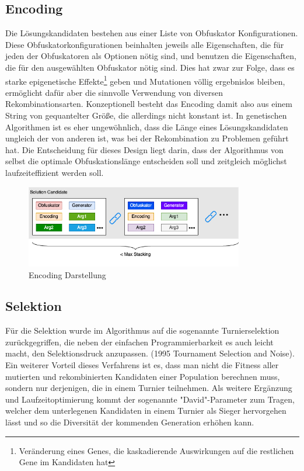 \subsection{Encoding}
Die Lösungskandidaten bestehen aus einer Liste von Obfuskator Konfigurationen. Diese Obfuskatorkonfigurationen beinhalten jeweils alle Eigenschaften, die für jeden der Obfuskatoren als Optionen nötig sind, und benutzen die Eigenschaften, die für den ausgewählten Obfuskator nötig sind. Dies hat zwar zur Folge, dass es starke epigenetische Effekte\footnote{Veränderung eines Genes, die kaskadierende Auswirkungen auf die restlichen Gene im Kandidaten hat} geben und Mutationen völlig ergebnislos bleiben, ermöglicht dafür aber die sinnvolle Verwendung von diversen Rekombinationsarten. Konzeptionell besteht das Encoding damit also aus einem String von gequantelter Größe, die allerdings nicht konstant ist. 
In genetischen Algorithmen ist es eher ungewöhnlich, dass die Länge eines Lösungskandidaten ungleich der von anderen ist, was bei der Rekombination zu Problemen geführt hat. Die Entscheidung für dieses Design liegt darin, dass der Algorithmus von selbst die optimale Obfuskationslänge entscheiden soll und zeitgleich möglichst laufzeiteffizient werden soll.
\begin{figure}[h]
    \centering
    \includegraphics[width=0.85\textwidth]{gfx/Abbildungen/Encoding Diagram.png}
    \caption{Encoding Darstellung}
    \label{fig:encoding}
\end{figure}

\subsection{Selektion}
Für die Selektion wurde im Algorithmus auf die sogenannte Turnierselektion zurückgegriffen, die neben der einfachen Programmierbarkeit es auch leicht macht, den Selektionsdruck anzupassen. \cite{blickle_1996_a} (1995 Tournament Selection and Noise). Ein weiterer Vorteil dieses Verfahrens ist es, dass man nicht die Fitness aller mutierten und rekombinierten Kandidaten einer Population berechnen muss, sondern nur derjenigen, die in einem Turnier teilnehmen. Als weitere Ergänzung und Laufzeitoptimierung kommt der sogenannte "David"-Parameter zum Tragen, welcher dem unterlegenen Kandidaten in einem Turnier als Sieger hervorgehen lässt und so die Diversität der kommenden Generation erhöhen kann.

